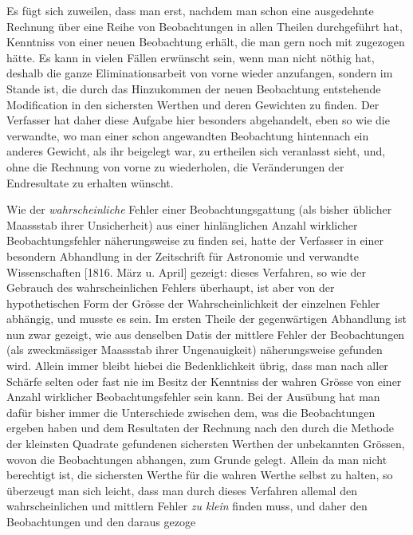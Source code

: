 Es fügt sich zuweilen, dass man erst, nachdem man schon eine ausgedehnte Rechnung über eine Reihe von Beobachtungen in allen Theilen durchgeführt hat, Kenntniss von einer neuen Beobachtung erhält, die man gern noch mit zugezogen hätte. Es kann in vielen Fällen erwünscht sein, wenn man nicht nöthig hat, deshalb die ganze Eliminationsarbeit von vorne wieder anzufangen, sondern im Stande ist, die durch das Hinzukommen der neuen Beobachtung entstehende Modification in den sichersten Werthen und deren Gewichten zu finden. Der Verfasser hat daher diese Aufgabe hier besonders abgehandelt, eben so wie die verwandte, wo man einer schon angewandten Beobachtung hintennach ein anderes Gewicht, als ihr beigelegt war, zu ertheilen sich veranlasst sieht, und, ohne die Rechnung von vorne zu wiederholen, die Veränderungen der Endresultate zu erhalten wünscht.

Wie der \textit{wahrscheinliche} Fehler einer Beobachtungsgattung (als bisher üblicher Maassstab ihrer Unsicherheit) aus einer hinlänglichen Anzahl wirklicher Beobachtungsfehler näherungsweise zu finden sei, hatte der Verfasser in einer besondern Abhandlung in der Zeitschrift für Astronomie und verwandte Wissenschaften [1816. März u. April] gezeigt: dieses Verfahren, so wie der Gebrauch des wahrscheinlichen Fehlers überhaupt, ist aber von der hypothetischen Form der Grösse der Wahrscheinlichkeit der einzelnen Fehler abhängig, und musste es sein. Im ersten Theile der gegenwärtigen Abhandlung ist nun zwar gezeigt, wie aus denselben Datis der mittlere Fehler der Beobachtungen (als zweckmässiger Maassstab ihrer Ungenauigkeit) näherungsweise gefunden wird. Allein immer bleibt hiebei die Bedenklichkeit übrig, dass man nach aller Schärfe selten oder fast nie im Besitz der Kenntniss der wahren Grösse von einer Anzahl wirklicher Beobachtungsfehler sein kann. Bei der Ausübung hat man dafür bisher immer die Unterschiede zwischen dem, was die Beobachtungen ergeben haben und dem Resultaten der Rechnung nach den durch die Methode der kleinsten Quadrate gefundenen sichersten Werthen der unbekannten Grössen, wovon die Beobachtungen abhangen, zum Grunde gelegt. Allein da man nicht berechtigt ist, die sichersten Werthe für die wahren Werthe selbst zu halten, so überzeugt man sich leicht, dass man durch dieses Verfahren allemal den wahrscheinlichen und mittlern Fehler \textit{zu klein} finden muss, und daher den Beobachtungen und den daraus gezoge%
